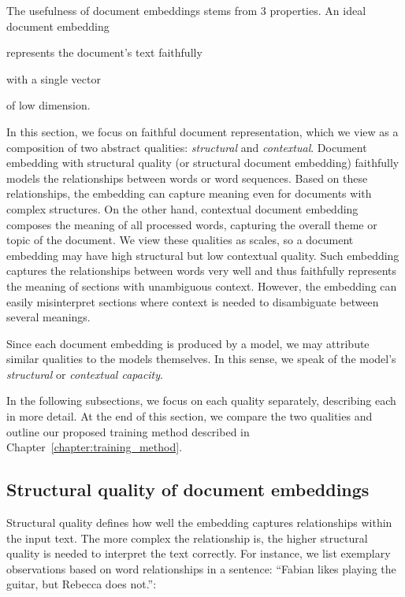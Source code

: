 The usefulness of document embeddings stems from 3 properties. An ideal
document embedding
\begin{enumerate*}[label=(\arabic*)]
  \item represents the document's text faithfully
  \item with a single vector
  \item of low dimension.
\end{enumerate*}

In this section, we focus on faithful document representation, which we view as
a composition of two abstract qualities: \emph{structural} and
\emph{contextual}. Document embedding with structural quality (or structural
document embedding) faithfully models the relationships between words or word
sequences. Based on these relationships, the embedding can capture meaning even
for documents with complex structures. On the other hand, contextual document
embedding composes the meaning of all processed words, capturing the overall
theme or topic of the document. We view these qualities as scales, so a
document embedding may have high structural but low contextual quality.
Such embedding captures the relationships between words very well and thus
faithfully represents the meaning of sections with unambiguous context.
However, the embedding can easily misinterpret sections where context is
needed to disambiguate between several meanings.

Since each document embedding is produced by a model, we may attribute similar
qualities to the models themselves. In this sense, we speak of the model's
\emph{structural} or \emph{contextual capacity}.

In the following subsections, we focus on each quality separately, describing
each in more detail. At the end of this section, we compare the two
qualities and outline our proposed training method described in
Chapter~\ref{chapter:training_method}.

\subsection{Structural quality of document embeddings}

Structural quality defines how well the embedding captures relationships within
the input text. The more complex the relationship is, the higher structural
quality is needed to interpret the text correctly. For instance, we list
exemplary observations based on word relationships in a sentence: ``Fabian
likes playing the guitar, but Rebecca does not.'':

